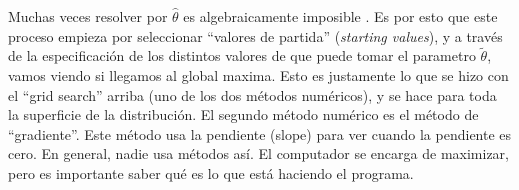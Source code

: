 \documentclass[onesided]{article}\usepackage[]{graphicx}\usepackage[]{color}
\begin{document}
Muchas veces resolver por $\hat\theta$ es algebraicamente imposible \parencite[72]{King1998}. Es por esto que este proceso empieza por seleccionar ``valores de partida'' (\emph{starting values}), y a trav\'es de la especificaci\'on de los distintos valores de que puede tomar el parametro $\tilde{\theta}$, vamos viendo si llegamos al global maxima. Esto es justamente lo que se hizo con el ``grid search'' arriba (uno de los dos m\'etodos num\'ericos), y se hace para toda la superficie de la distribuci\'on. El segundo m\'etodo num\'erico es el m\'etodo de ``gradiente''. Este m\'etodo usa la pendiente (slope) para ver cuando la pendiente es cero. En general, nadie usa m\'etodos as\'i. El computador se encarga de maximizar, pero es importante saber qu\'e es lo que est\'a haciendo el programa.


\paragraph{}
\paragraph{}
\setcounter{page}{1}
\printbibliography
\end{document}
